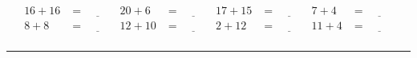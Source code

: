 \documentclass{article}
\begin{document}
\begin{sloppy}
\begin{align*}
    {16} + {16} &= \underline{\hspace{1cm}} & {20} + {6} &= \underline{\hspace{1cm}} & {17} + {15} &= \underline{\hspace{1cm}} & {7} + {4} &= \underline{\hspace{1cm}} \\
    {8} + {8} &= \underline{\hspace{1cm}} & {12} + {10} &= \underline{\hspace{1cm}} & {2} + {12} &= \underline{\hspace{1cm}} & {11} + {4} &= \underline{\hspace{1cm}} \\
\end{align*}
\hrule
\end{sloppy}
\end{document}
